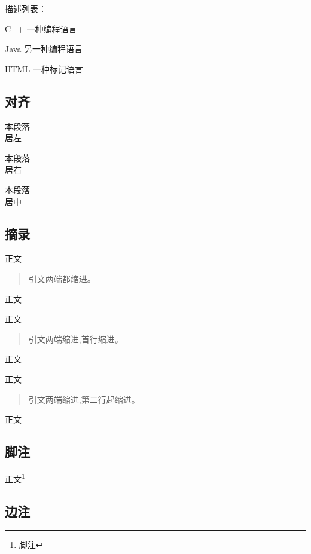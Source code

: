 \documentclass[a4paper,12pt,draft]{report}
\renewcommand{\thefootnote}{\roman{footnote}} %
\begin{document}
描述列表：
\begin{description} 
	\item{C++} 一种编程语言 
	\item{Java} 另一种编程语言 
	\item{HTML} 一种标记语言
\end{description}

 \subsection{对齐}
 \begin{flushleft} 
 本段落\\
 居左 
 \end{flushleft}
 
  \begin{flushright} 
  本段落\\
  居右 
  \end{flushright}
 
 \begin{center} 
 本段落\\
 居中 
 \end{center}
 
\subsection{摘录}
正文
\begin{quote}
引文两端都缩进。
\end{quote}
正文

正文
\begin{quotation}
引文两端缩进,首行缩进。
\end{quotation}
正文

正文
\begin{verse}
引文两端缩进,第二行起缩进。
\end{verse}
正文

\subsection{脚注}
正文\footnote{脚注}

\subsection{边注}
 \reversemarginpar
{} \normalmarginpar
\end{document}
